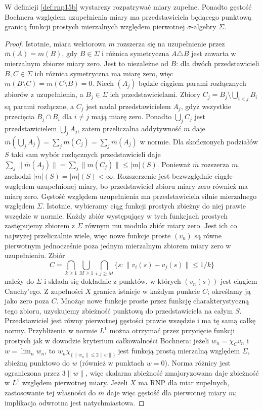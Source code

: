 \begin{stwierdzenie}
\label{prop:rnp-completion15b}
W definicji \ref{def:rnp15b} wystarczy rozpatrywać miary
zupełne. Ponadto gęstość Bochnera względem uzupełnienia
miary ma przedstawiciela będącego punktową granicą
funkcji prostych mierzalnych względem pierwotnej
$\sigma$-algebry $\Sigma$.
\end{stwierdzenie}
\begin{proof}
Istotnie, miara wektorowa $m$ rozszerza się na uzupełnienie przez
$\bar m(A)=m(B)$, gdy $B\in\Sigma$ i różnica symetryczna
$A\triangle B$ jest zawarta w mierzalnym zbiorze miary zero.
Jest to niezależne od $B$: dla dwóch przedstawicieli
$B,C\in\Sigma$ ich różnica symetryczna ma miarę zero,
więc $m(B\setminus C)=m(C\setminus B)=0$.
Niech $(A_j)$ będzie ciągiem parami rozłącznych zbiorów
z uzupełnienia, a $B_j\in\Sigma$ ich przedstawicielami.
Zbiory $C_j=B_j\setminus\bigcup_{i<j}B_i$ są parami
rozłączne, a $C_j$ jest nadal przedstawicielem $A_j$,
gdyż wszystkie przecięcia $B_j\cap B_i$ dla $i\ne j$
mają miarę zero. Ponadto $\bigcup_j C_j$ jest przedstawicielem
$\bigcup_j A_j$, zatem przeliczalna addytywność $m$ daje
$\bar m(\bigcup_j A_j)=\sum_j m(C_j)=\sum_j\bar m(A_j)$
w normie. Dla skończonych podziałów $S$ taki sam wybór
rozłącznych przedstawicieli daje
$\sum_j\|\bar m(A_j)\|=\sum_j\|m(C_j)\|\le |m|(S)$.
Ponieważ $\bar m$ rozszerza $m$, zachodzi
$|\bar m|(S)=|m|(S)<\infty$. Rozszerzenie jest bezwzględnie
ciągłe względem uzupełnionej miary, bo przedstawiciel
zbioru miary zero również ma miarę zero.
Gęstość względem uzupełnienia ma przedstawiciela
silnie mierzalnego względem $\Sigma$. Istotnie, wybieramy
ciąg funkcji prostych zbieżny do niej prawie wszędzie
w normie. Każdy zbiór występujący w tych funkcjach prostych
zastępujemy zbiorem z $\Sigma$ równym mu modulo zbiór
miary zero. Jest ich co najwyżej przeliczalnie wiele,
więc nowe funkcje proste $(v_n)$ są równe pierwotnym
jednocześnie poza jednym mierzalnym zbiorem miary zero
w uzupełnieniu. Zbiór
\[
 C=\bigcap_{k\ge1}\bigcup_{M\ge1}\bigcap_{i,j\ge M}
       \{s:\|v_i(s)-v_j(s)\|\le 1/k\}
\]
należy do $\Sigma$ i składa się dokładnie z punktów,
w których $(v_n(s))$ jest ciągiem Cauchy'ego.
Z zupełności $X$ granica istnieje w każdym punkcie $C$;
określamy ją jako zero poza $C$.
Mnożąc nowe funkcje proste przez funkcję charakterystyczną
tego zbioru, uzyskujemy zbieżność punktową do przedstawiciela
na całym $S$. Przedstawiciel jest równy pierwotnej gęstości
prawie wszędzie i ma tę samą całkę normy. Przybliżenia
w normie $L^1$ można otrzymać przez przycięcie funkcji
prostych jak w dowodzie kryterium całkowalności Bochnera:
jeżeli $w_n=\chi_C v_n$ i $w=\lim_n w_n$, to
$w_n\chi_{\{\|w_n\|\le 2\|w\|\}}$ jest funkcją prostą
mierzalną względem $\Sigma$, zbieżną punktowo do $w$
(również w punktach $w=0$). Norma różnicy jest ograniczona
przez $3\|w\|$, więc skalarna zbieżność zmajoryzowana
daje zbieżność w $L^1$ względem pierwotnej miary.
Jeżeli $X$ ma RNP dla miar zupełnych, zastosowanie tej
własności do $\bar m$ daje więc gęstość dla pierwotnej
miary $m$; implikacja odwrotna jest natychmiastowa.
\end{proof}

